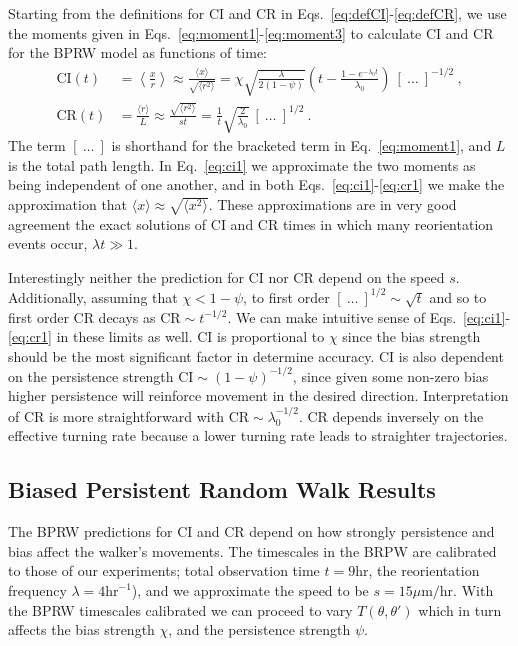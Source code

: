 Starting from the definitions for CI and CR in Eqs.\ \ref{eq:defCI}-\ref{eq:defCR}, we use the moments given in Eqs.\ \ref{eq:moment1}-\ref{eq:moment3} to calculate CI and CR for the BPRW model as functions of time:
\begin{align} \label{eq:ci1}
    \text{CI}(t) &= \left\langle \frac{x}{r} \right\rangle \approx
    \frac{\langle x \rangle}{\sqrt{\langle r^2 \rangle}}
    = \chi \sqrt{\frac{\lambda}{2(1-\psi)}} \left(t -\frac{1-e^{-\lambda_0 t}}{\lambda_0} \right) \
    [ \ \ldots \ ]^{-1/2} \ , \\
    \text{CR}(t) &= \frac{\langle r \rangle}{L} \approx
    \frac{\sqrt{\langle r^2 \rangle}}{st}
    = \frac{1}{t}\sqrt{\frac{2}{\lambda_0}} \
    [ \ \ldots \ ]^{1/2} \ .
    \label{eq:cr1}
\end{align}
The term $[ \ \ldots \ ]$ is shorthand for the bracketed term in Eq.\ \ref{eq:moment1}, and $L$ is the total path length. In Eq.\ \ref{eq:ci1} we approximate the two moments as being independent of one another, and in both Eqs.\ \ref{eq:ci1}-\ref{eq:cr1} we make the approximation that
$\langle x \rangle \approx \sqrt{\langle x^2 \rangle}$.
These approximations are in very good agreement the exact solutions of CI and CR times in which many reorientation events occur, $\lambda t \gg 1$.

Interestingly neither the prediction for CI nor CR depend on the speed $s$. Additionally, assuming that $\chi < 1 - \psi$,
to first order $[ \ \ldots \ ]^{1/2} \sim \sqrt{t}$ and so
to first order CR decays as $\text{CR} \sim t^{-1/2}$. We can make intuitive sense of Eqs.\ \ref{eq:ci1}-\ref{eq:cr1} in these limits as well. CI is proportional to $\chi$ since the bias strength should be the most significant factor in determine accuracy. CI is also dependent on the persistence strength
$\text{CI} \sim (1-\psi)^{-1/2}$, since given some non-zero bias higher persistence will reinforce movement in the desired direction. Interpretation of CR is more straightforward with
$\text{CR} \sim \lambda_0^{-1/2}$. CR depends inversely on the effective turning rate because a lower turning rate leads to straighter trajectories.


\subsection{Biased Persistent Random Walk Results}

The BPRW predictions for CI and CR depend on how strongly persistence and bias affect the walker's movements. The timescales in the BRPW are calibrated to those of our experiments; total observation time $t = 9 \text{hr}$, the reorientation frequency
$\lambda = 4 \text{hr}^{-1}$), and we approximate the speed to be
$s = 15 \mu\text{m/hr}$.
With the BPRW timescales calibrated we can proceed to vary $T(\theta,\theta')$ which in turn affects the bias strength $\chi$, and the persistence strength $\psi$.

